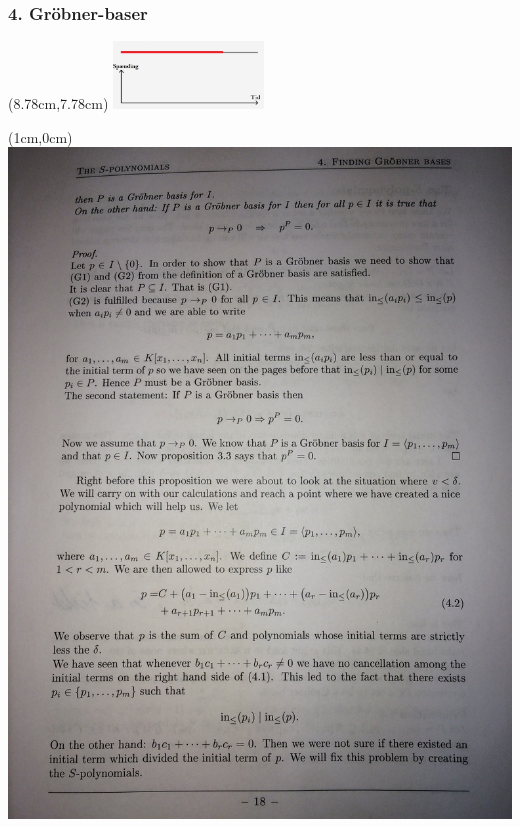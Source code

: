 \documentclass[10pt,notheorems,xcolor=pdftex,dvipsnames,table]{beamer}
\renewcommand{\{}{\left\lbrace}
\renewcommand{\}}{\right\rbrace}
\begin{document}
\begin{frame}[t]
\frametitle{
		\LARGE{4. Gröbner-baser}}
				\begin{textblock*}{0.1cm}(8.78cm,7.78cm)  
					\includegraphics[width=4cm]{disposition/d16.jpg}
				\end{textblock*}				
				\begin{textblock*}{0.85cm}(1cm,0cm)
					\includegraphics[scale=0.087]{1.jpg}
				\end{textblock*}				
\end{frame}
\end{document}
